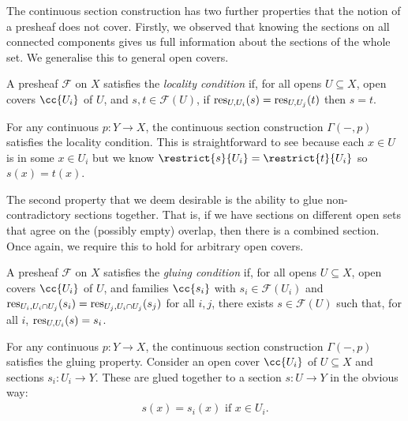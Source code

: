 \documentclass{article}
\begin{document}
The continuous section construction has two further properties that
the notion of a presheaf does not cover. Firstly, we observed that
knowing the sections on all connected components gives us full
information about the sections of the whole set. We generalise this to
general open covers.

\begin{definition}
  A presheaf $\mathscr F$ on $X$ satisfies the \emph{locality condition}
  if, for all opens $U\subseteq X$, open covers $\cc{U_i}$ of $U$,
  and $s,t\in\mathscr F(U)$, if $\operatorname{res}_{U,U_i}(s) = \operatorname{res}_{U,U_j}(t)$
  then $s=t$.
\end{definition}

\begin{example}
  For any continuous $p:Y\to X$, the continuous section
  construction $\Gamma(-,p)$ satisfies the locality condition.
  This is straightforward to see because each $x\in U$ is in
  some $x\in U_i$ but we know $\restrict{s}{U_i}=\restrict{t}{U_i}$
  so $s(x) = t(x)$.
\end{example}



The second property that we deem desirable is the ability to glue
non-contradictory sections together. That is, if we have sections
on different open sets that agree on the (possibly empty) overlap,
then there is a combined section. Once again, we require this to
hold for arbitrary open covers.

\begin{definition}
  A presheaf $\mathscr F$ on $X$ satisfies the \emph{gluing condition}
  if, for all opens $U\subseteq X$, open covers $\cc{U_i}$ of $U$,
  and families $\cc{s_i}$ with $s_i\in\mathscr F(U_i)$ and
  $\operatorname{res}_{U_i,U_i\cap U_j}(s_i) = \operatorname{res}_{U_j,U_i\cap U_j}(s_j)$
  for all $i,j$, there exists $s\in\mathscr F(U)$ such that,
  for all $i$, $\operatorname{res}_{U,U_i}(s) = s_i$.
\end{definition}

\begin{example}
  For any continuous $p:Y\to X$, the continuous section construction
  $\Gamma(-,p)$ satisfies the gluing property. Consider an open cover
  $\cc{U_i}$ of $U\subseteq X$ and sections $s_i:U_i\to Y$. These are
  glued together to a section $s:U\to Y$ in the obvious way:
  \begin{align*}
    s(x) = s_i(x) \text{ if $x\in U_i$}.
  \end{align*}
\end{example}
\end{document}
